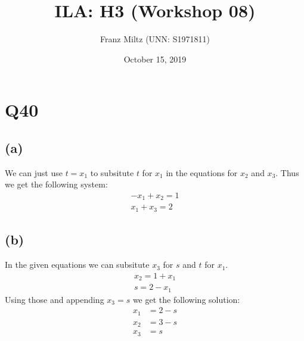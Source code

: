 \documentclass{article}
\title{ILA: H3 (Workshop 08)}
\author{Franz Miltz (UNN: S1971811)}
\date{October 15, 2019}
\begin{document}
\maketitle
\section*{Q40}
\subsection*{(a)}
We can just use $t=x_1$ to subsitute $t$ for $x_1$ in the equations for $x_2$ and $x_3$. Thus we get the following system:
\begin{align*}
    -x_1+x_2=1 \\
    x_1+x_3=2
\end{align*}
\subsection*{(b)}
In the given equations we can subsitute $x_3$ for $s$ and $t$ for $x_1$.
\begin{align*}
    x_2 = 1 + x_1 \\
    s = 2 - x_1
\end{align*}
Using those and appending $x_3=s$ we get the following solution:
\begin{align*}
    x_1 & = 2-s \\
    x_2 & = 3-s \\
    x_3 & = s
\end{align*}
\end{document}
